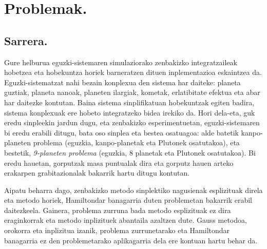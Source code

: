\chapter{Problemak.}

\section{Sarrera.}



Gure helburua eguzki-sistemaren simulaziorako zenbakizko integratzaileak hobetzea eta hobekuntza horiek barneratzen dituen inplementazioa eskaintzea da. Eguzki-sistematzat nahi bezain konplexua den sistema har daiteke: planeta guztiak, planeta nanoak, planeten ilargiak, kometak, erlatibitate efektua eta abar har daitezke kontutan. Baina sistema sinplifikatuan hobekuntzak egiten badira, sistema konplexuak ere hobeto integratzeko bidea irekiko da. Hori dela-eta, guk eredu sinpleekin jardun dugu, eta zenbakizko esperimentuetan, eguzki-sistemaren bi eredu erabili ditugu, bata oso sinplea eta bestea osatuagoa: alde batetik  kanpo-planeten problema (eguzkia, kanpo-planetak eta Plutonek osatutakoa), eta bestetik, \emph{9-planeten problema}  (eguzkia, 8 planetak eta Plutonek osatutakoa).  Bi eredu hauetan, gorputzak masa puntualak dira eta gorputz hauen arteko erakarpen grabitazionalak bakarrik hartu ditugu kontutan.

Aipatu beharra dago, zenbakizko metodo sinplektiko nagusienak esplizituak direla eta metodo horiek, Hamiltondar banagarria duten problemetan bakarrik erabil daitezkeela. Gainera, problema zurruna bada metodo esplizituak ez dira eraginkorrak eta metodo inplizituek abantaila azaltzen dute. Gauss metodoa, orokorra  eta inplizitua izanik, problema zurrunetarako eta Hamiltondar banagarria ez den problemetarako  aplikagarria dela ere kontuan hartu behar da. 
 
